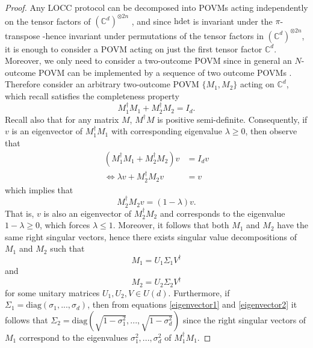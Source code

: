 \documentclass{article}
\begin{document}
\begin{proof}
    Any LOCC protocol can be decomposed into POVMs acting independently on the tensor factors of $(\mathbb{C}^d)^{\otimes 2n}$ \cite{dur2000three}, and since $\mathrm{hdet}$ is invariant under the $\pi$-transpose -hence invariant under permutations of the tensor factors in $(\mathbb{C}^d)^{\otimes 2n}$, it is enough to consider a POVM acting on just the first tensor factor $\mathbb{C}^d$. Moreover, we only need to consider a two-outcome  POVM since in general an $N$-outcome POVM can be implemented by a sequence of two outcome POVMs \cite{dur2000three}. Therefore consider an arbitrary two-outcome POVM $\{M_1,M_2\}$ acting on $\mathbb{C}^d$, which recall satisfies the completeness property 
    \[M_1^{\dagger}M_1+M_2^{\dagger}M_2 = I_d.\]
    Recall also that for any matrix $M$, $M^{\dagger}M$ is positive semi-definite. Consequently, if $v$ is an eigenvector of $M_1^{\dagger}M_1$ with corresponding eigenvalue $\lambda\geq 0$, then observe that 
    \begin{align}
        (M_1^{\dagger}M_1+M_2^{\dagger}M_2)v &= I_dv \label{eigenvector1} \\
        \iff \lambda v + M_2^{\dagger}M_2v &= v \label{eigenvector2}
    \end{align}
    which implies that 
    \[M_2^{\dagger}M_2v = (1-\lambda)v.\] 
    That is, $v$ is also an eigenvector of $M_2^{\dagger}M_2$ and corresponds to the eigenvalue $1-\lambda\geq 0$, which forces $\lambda \leq 1$. Moreover, it follows that both $M_1$ and $M_2$ have the same right singular vectors, hence there exists singular value decompositions of $M_1$ and $M_2$ such that 
    \begin{equation}\label{SVD1}
        M_1 = U_1\Sigma_1 V^{\dagger}
    \end{equation}
    and
    \begin{equation}\label{SVD2}
        M_2 = U_2\Sigma_2 V^{\dagger}
    \end{equation}
    for some unitary matrices $U_1,U_2,V \in U(d)$. Furthermore, if $\Sigma_1 = \mathrm{diag}(\sigma_1,...,\sigma_d)$, then from equations \eqref{eigenvector1} and \eqref{eigenvector2} it follows that $\Sigma_2 = \mathrm{diag}(\sqrt{1-\sigma_1^2},...,\sqrt{1-\sigma_d^2})$ since the right singular vectors of $M_1$ correspond to the eigenvalues $\sigma_1^2,...,\sigma_d^2$ of $M_1^{\dagger}M_1$. 


\end{proof}
\end{document}
